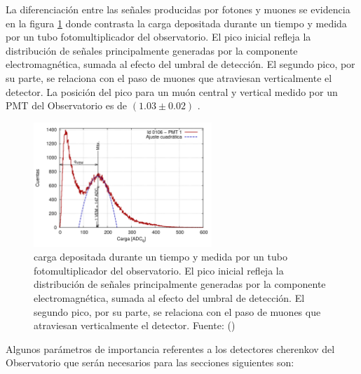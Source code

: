 La diferenciación entre las señales producidas por fotones y muones se evidencia en la figura \ref{cargahist} donde contrasta la carga depositada durante un tiempo y medida por un tubo fotomultiplicador del observatorio. El pico inicial refleja la distribución de señales principalmente generadas por la componente electromagnética, sumada al efecto del umbral de detección. El segundo pico, por su parte, se relaciona con el paso de muones que atraviesan verticalmente el detector. La posición del pico para un muón central y vertical medido por un PMT del Observatorio es de $(1.03\pm0.02)$ \cite{asorey}.

\begin{figure}[h!]
  \centering
\includegraphics[width=0.6\textwidth]{Figs/histograma_carga.png}
  \caption{carga depositada durante un tiempo y medida por un tubo fotomultiplicador del observatorio. El pico inicial refleja la distribución de señales principalmente generadas por la componente electromagnética, sumada al efecto del umbral de detección. El segundo pico, por su parte, se relaciona con el paso de muones que atraviesan verticalmente el detector. Fuente: (\cite{asorey})}
  \label{cargahist}
\end{figure}
Algunos parámetros de importancia referentes a los detectores cherenkov del Observatorio que serán necesarios para las secciones siguientes son:
